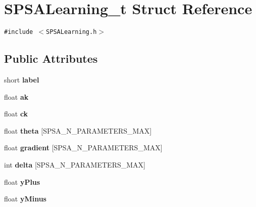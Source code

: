 \hypertarget{structSPSALearning__t}{
\section{SPSALearning\_\-t Struct Reference}
\label{structSPSALearning__t}
}
{\tt \#include $<$SPSALearning.h$>$}

\subsection*{Public Attributes}
\begin{CompactItemize}
\item 
\hypertarget{structSPSALearning__t_6d35501a97900b5ad6ea104d394bcc3d}{
short \textbf{label}}
\label{structSPSALearning__t_6d35501a97900b5ad6ea104d394bcc3d}

\item 
\hypertarget{structSPSALearning__t_53dee221203bca2f839c279ef7e8fbcf}{
float \textbf{ak}}
\label{structSPSALearning__t_53dee221203bca2f839c279ef7e8fbcf}

\item 
\hypertarget{structSPSALearning__t_ab6a4f69710520c884ba1a44afddf43b}{
float \textbf{ck}}
\label{structSPSALearning__t_ab6a4f69710520c884ba1a44afddf43b}

\item 
\hypertarget{structSPSALearning__t_bbf7b2ac986b1a7a8e93e2767fbd3597}{
float \textbf{theta} \mbox{[}SPSA\_\-N\_\-PARAMETERS\_\-MAX\mbox{]}}
\label{structSPSALearning__t_bbf7b2ac986b1a7a8e93e2767fbd3597}

\item 
\hypertarget{structSPSALearning__t_d1ef8c994d472e890a6a29fbd4345c04}{
float \textbf{gradient} \mbox{[}SPSA\_\-N\_\-PARAMETERS\_\-MAX\mbox{]}}
\label{structSPSALearning__t_d1ef8c994d472e890a6a29fbd4345c04}

\item 
\hypertarget{structSPSALearning__t_f30b863f8f0c4cccc8d5da94d0728f78}{
int \textbf{delta} \mbox{[}SPSA\_\-N\_\-PARAMETERS\_\-MAX\mbox{]}}
\label{structSPSALearning__t_f30b863f8f0c4cccc8d5da94d0728f78}

\item 
\hypertarget{structSPSALearning__t_10e736df9356e663312c32d4fd524f99}{
float \textbf{yPlus}}
\label{structSPSALearning__t_10e736df9356e663312c32d4fd524f99}

\item 
\hypertarget{structSPSALearning__t_5bd764616cd9249a57dfefb8e295a547}{
float \textbf{yMinus}}
\label{structSPSALearning__t_5bd764616cd9249a57dfefb8e295a547}


\end{CompactItemize}
